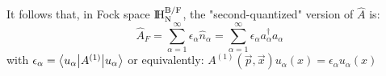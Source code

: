 It follows that, in Fock space $\rm I\!H_N^{B/F}$, the "second-quantized" version of $\widehat A$ is:
\begin{equation}\label{eq:single particle operator}
    \boxed{\widehat A_F = \sum_{\alpha=1}^\infty \epsilon_\alpha \hat n_\alpha = \sum_{\alpha=1}^\infty \epsilon_\alpha a_\alpha^\dag a_\alpha}
\end{equation}
with $\epsilon_\alpha = \left\langle u_\alpha \middle| A^{(1)} \middle| u_\alpha \right\rangle$ \qquad  or equivalently: $A^{(1)} (\vec p, \vec x) u_\alpha(x) = \epsilon_\alpha u_\alpha(x)$\\
\\

